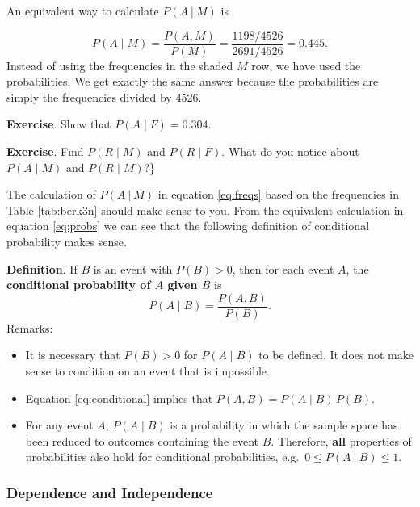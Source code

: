 \documentclass[
  11pt,
  british,
  openany, a4paper]{book}
\providecommand{\tightlist}{%
  \setlength{\itemsep}{0pt}\setlength{\parskip}{0pt}}
\begin{document}
An equivalent way to calculate \(P(A~|~M)\) is

\begin{equation}
P(A \mid M) = \frac{P(A, M)}{P(M)} = \frac{1198/4526}{2691/4526} = 0.445. \label{eq:probs}
\end{equation}
Instead of using the frequencies in the shaded \(M\) row, we have used the probabilities. We get exactly the same answer because the probabilities are simply the frequencies divided by 4526.

\textbf{Exercise}. Show that \(P(A \mid F)=0.304\).

\textbf{Exercise}. Find \(P(R \mid M)\) and \(P(R \mid F)\). What do you notice about \(P(A \mid M)\) and \(P(R \mid M)\)?\}

The calculation of \(P(A~|~M)\) in equation \eqref{eq:freqs} based on the frequencies in Table \ref{tab:berk3n} should make sense to you. From the equivalent calculation in equation \eqref{eq:probs} we can see that the following definition of conditional probability makes sense.

\textbf{Definition}. If \(B\) is an event with \(P(B) > 0\), then for each event \(A\), the \textbf{conditional probability of \(A\) given \(B\)} is
\begin{equation}
P(A \mid B)=\frac{P(A , B)}{P(B)}.
\label{eq:conditional}
\end{equation}
Remarks:

\begin{itemize}
\tightlist
\item
  It is necessary that \(P(B) > 0\) for \(P(A \mid B)\) to be defined. It does not make sense to condition on an event that is impossible.
\item
  Equation \eqref{eq:conditional} implies that \(P(A , B) = P(A \mid B)\,P(B)\).
\item
  For any event \(A\), \(P(A \mid B)\) is a probability in which the sample space has been reduced to outcomes containing the event \(B\). Therefore, \textbf{all} properties of probabilities also hold for conditional probabilities, e.g.~\(0 \leq P(A~|~B) \leq 1\).
\end{itemize}

\hypertarget{dependence-and-independence}{%
\subsubsection*{Dependence and Independence}\label{dependence-and-independence}}
\end{document}
